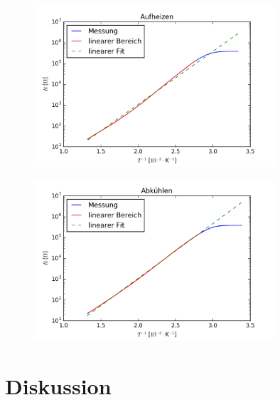 \documentclass[a4paper,parskip,11pt, DIV12]{scrreprt}
\begin{document}
\begin{figure}[h]
\centering
    	\includegraphics[width=0.8\textwidth]{temp_heat.png}
	\caption{}
	\label{temp_heat}
\end{figure}

\begin{figure}[h]
\centering
    	\includegraphics[width=0.8\textwidth]{temp_cool.png}
	\caption{}
	\label{temp_cool}
\end{figure}

\clearpage

\chapter{Diskussion}
\label{ch:Diskussion}
\end{document}
